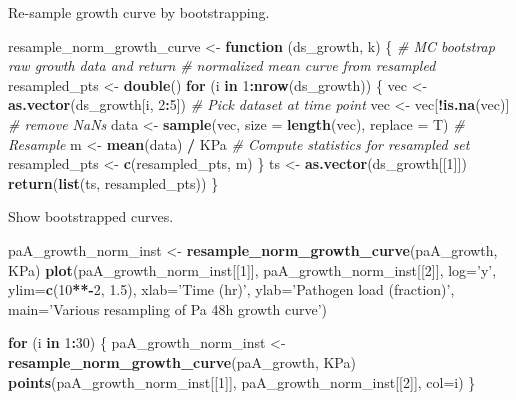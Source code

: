 \documentclass[]{article}
\newenvironment{Shaded}{\begin{snugshade}}{\end{snugshade}}
\newcommand{\KeywordTok}[1]{\textcolor[rgb]{0.13,0.29,0.53}{\textbf{#1}}}
\newcommand{\DataTypeTok}[1]{\textcolor[rgb]{0.13,0.29,0.53}{#1}}
\newcommand{\DecValTok}[1]{\textcolor[rgb]{0.00,0.00,0.81}{#1}}
\newcommand{\FloatTok}[1]{\textcolor[rgb]{0.00,0.00,0.81}{#1}}
\newcommand{\StringTok}[1]{\textcolor[rgb]{0.31,0.60,0.02}{#1}}
\newcommand{\CommentTok}[1]{\textcolor[rgb]{0.56,0.35,0.01}{\textit{#1}}}
\newcommand{\ControlFlowTok}[1]{\textcolor[rgb]{0.13,0.29,0.53}{\textbf{#1}}}
\newcommand{\OperatorTok}[1]{\textcolor[rgb]{0.81,0.36,0.00}{\textbf{#1}}}
\newcommand{\NormalTok}[1]{#1}
\begin{document}
Re-sample growth curve by bootstrapping.

\begin{Shaded}
\begin{Highlighting}[]
\NormalTok{resample_norm_growth_curve <-}\StringTok{ }\ControlFlowTok{function}\NormalTok{ (ds_growth, k) \{}
  \CommentTok{# MC bootstrap raw growth data and return}
  \CommentTok{# normalized mean curve from resampled }
\NormalTok{  resampled_pts <-}\StringTok{ }\KeywordTok{double}\NormalTok{()}
  \ControlFlowTok{for}\NormalTok{ (i }\ControlFlowTok{in} \DecValTok{1}\OperatorTok{:}\KeywordTok{nrow}\NormalTok{(ds_growth)) \{}
\NormalTok{    vec <-}\StringTok{ }\KeywordTok{as.vector}\NormalTok{(ds_growth[i, }\DecValTok{2}\OperatorTok{:}\DecValTok{5}\NormalTok{])  }\CommentTok{# Pick dataset at time point}
\NormalTok{    vec <-}\StringTok{ }\NormalTok{vec[}\OperatorTok{!}\KeywordTok{is.na}\NormalTok{(vec)]  }\CommentTok{# remove NaNs}
\NormalTok{    data <-}\StringTok{ }\KeywordTok{sample}\NormalTok{(vec, }\DataTypeTok{size =} \KeywordTok{length}\NormalTok{(vec), }\DataTypeTok{replace =}\NormalTok{ T) }\CommentTok{# Resample}
\NormalTok{    m <-}\StringTok{ }\KeywordTok{mean}\NormalTok{(data) }\OperatorTok{/}\StringTok{ }\NormalTok{KPa }\CommentTok{# Compute statistics for resampled set}
\NormalTok{    resampled_pts <-}\StringTok{ }\KeywordTok{c}\NormalTok{(resampled_pts, m)}
\NormalTok{  \}}
\NormalTok{  ts <-}\StringTok{ }\KeywordTok{as.vector}\NormalTok{(ds_growth[[}\DecValTok{1}\NormalTok{]])}
  \KeywordTok{return}\NormalTok{(}\KeywordTok{list}\NormalTok{(ts, resampled_pts))}
\NormalTok{\}}
\end{Highlighting}
\end{Shaded}

Show bootstrapped curves.

\begin{Shaded}
\begin{Highlighting}[]
\NormalTok{paA_growth_norm_inst <-}\StringTok{ }\KeywordTok{resample_norm_growth_curve}\NormalTok{(paA_growth, KPa)}
\KeywordTok{plot}\NormalTok{(paA_growth_norm_inst[[}\DecValTok{1}\NormalTok{]], paA_growth_norm_inst[[}\DecValTok{2}\NormalTok{]], }
     \DataTypeTok{log=}\StringTok{'y'}\NormalTok{, }
     \DataTypeTok{ylim=}\KeywordTok{c}\NormalTok{(}\DecValTok{10}\OperatorTok{**-}\DecValTok{2}\NormalTok{, }\FloatTok{1.5}\NormalTok{), }
     \DataTypeTok{xlab=}\StringTok{'Time (hr)'}\NormalTok{,}
     \DataTypeTok{ylab=}\StringTok{'Pathogen load (fraction)'}\NormalTok{,}
     \DataTypeTok{main=}\StringTok{'Various resampling of Pa 48h growth curve'}\NormalTok{)}

\ControlFlowTok{for}\NormalTok{ (i }\ControlFlowTok{in} \DecValTok{1}\OperatorTok{:}\DecValTok{30}\NormalTok{) \{}
\NormalTok{  paA_growth_norm_inst <-}\StringTok{ }\KeywordTok{resample_norm_growth_curve}\NormalTok{(paA_growth, KPa)}
  \KeywordTok{points}\NormalTok{(paA_growth_norm_inst[[}\DecValTok{1}\NormalTok{]], paA_growth_norm_inst[[}\DecValTok{2}\NormalTok{]], }\DataTypeTok{col=}\NormalTok{i)}
\NormalTok{\}}
\end{Highlighting}
\end{Shaded}
\end{document}
